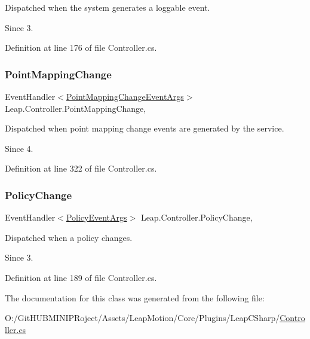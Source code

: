 Dispatched when the system generates a loggable event. 

\begin{DoxySince}{Since}
3. 
\end{DoxySince}


Definition at line 176 of file Controller.\+cs.

\mbox{\label{class_leap_1_1_controller_a148e5d3bcc1f4e4d3c972d7482f1d1ab}} 
\subsubsection{\texorpdfstring{PointMappingChange}{PointMappingChange}}
{\footnotesize\ttfamily Event\+Handler$<$\mbox{\hyperlink{class_leap_1_1_point_mapping_change_event_args}{Point\+Mapping\+Change\+Event\+Args}}$>$ Leap.\+Controller.\+Point\+Mapping\+Change\hspace{0.3cm}{\ttfamily [add]}, {\ttfamily [remove]}}



Dispatched when point mapping change events are generated by the service. 

\begin{DoxySince}{Since}
4. 
\end{DoxySince}


Definition at line 322 of file Controller.\+cs.

\mbox{\label{class_leap_1_1_controller_a0177e366833918615a05f1be4177c53b}} 
\subsubsection{\texorpdfstring{PolicyChange}{PolicyChange}}
{\footnotesize\ttfamily Event\+Handler$<$\mbox{\hyperlink{class_leap_1_1_policy_event_args}{Policy\+Event\+Args}}$>$ Leap.\+Controller.\+Policy\+Change\hspace{0.3cm}{\ttfamily [add]}, {\ttfamily [remove]}}



Dispatched when a policy changes. 

\begin{DoxySince}{Since}
3. 
\end{DoxySince}


Definition at line 189 of file Controller.\+cs.



The documentation for this class was generated from the following file\+:\begin{DoxyCompactItemize}
\item 
O\+:/\+Git\+H\+U\+B\+M\+I\+N\+I\+P\+Roject/\+Assets/\+Leap\+Motion/\+Core/\+Plugins/\+Leap\+C\+Sharp/\mbox{\hyperlink{_controller_8cs}{Controller.\+cs}}\end{DoxyCompactItemize}
